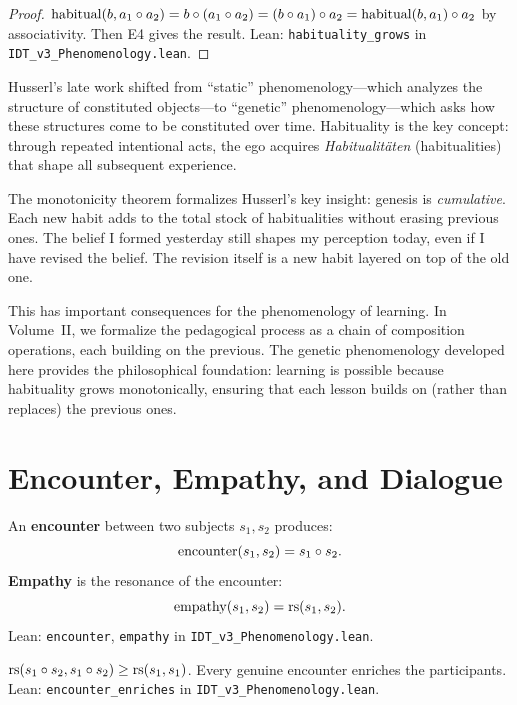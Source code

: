 \begin{proof}
$\mathrm{habitual}(b, a_1 \circ a_2) = b \circ (a_1 \circ a_2) =
(b \circ a_1) \circ a_2 = \mathrm{habitual}(b, a_1) \circ a_2$ by
associativity.  Then E4 gives the result.
Lean: \texttt{habituality\_grows} in \texttt{IDT\_v3\_Phenomenology.lean}.
\end{proof}

\begin{interpretation}
\label{interp:genetic-turn}
Husserl's late work shifted from ``static'' phenomenology---which analyzes the
structure of constituted objects---to ``genetic'' phenomenology---which asks how
these structures come to be constituted over time.  Habituality is the key
concept: through repeated intentional acts, the ego acquires \textit{Habitualit\"aten}
(habitualities) that shape all subsequent experience.

The monotonicity theorem formalizes Husserl's key insight: genesis is
\emph{cumulative}.  Each new habit adds to the total stock of habitualities
without erasing previous ones.  The belief I formed yesterday still shapes
my perception today, even if I have revised the belief.  The revision itself
is a new habit layered on top of the old one.

This has important consequences for the phenomenology of learning.
In Volume~II, we formalize the pedagogical process as a chain of
composition operations, each building on the previous.  The genetic
phenomenology developed here provides the philosophical foundation:
learning is possible because habituality grows monotonically, ensuring
that each lesson builds on (rather than replaces) the previous ones.
\end{interpretation}

\section{Encounter, Empathy, and Dialogue}

\begin{definition}
\label{def:encounter-empathy}
An \textbf{encounter} between two subjects $s_1, s_2$ produces:
\[
\mathrm{encounter}(s_1, s_2) = s_1 \circ s_2.
\]
\textbf{Empathy} is the resonance of the encounter:
\[
\mathrm{empathy}(s_1, s_2) = \mathrm{rs}(s_1, s_2).
\]
Lean: \texttt{encounter}, \texttt{empathy} in \texttt{IDT\_v3\_Phenomenology.lean}.
\end{definition}

\begin{theorem}
\label{thm:encounter-enriches}
$\mathrm{rs}(s_1 \circ s_2, s_1 \circ s_2) \geq \mathrm{rs}(s_1, s_1)$.
Every genuine encounter enriches the participants.
Lean: \texttt{encounter\_enriches} in \texttt{IDT\_v3\_Phenomenology.lean}.
\end{theorem}

